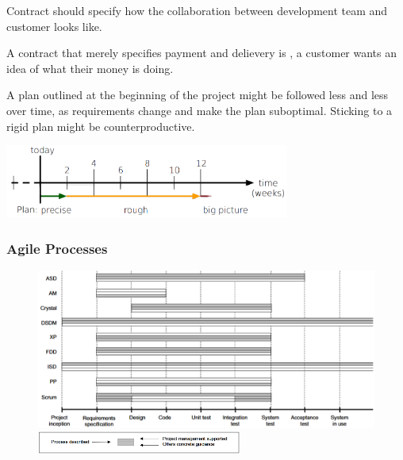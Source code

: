 \documentclass[
    ../../Software_Engineering_Summary.tex,
]
{subfiles}
\begin{document}
\begin{defbox}
    Contract should specify how the collaboration between development team and customer looks like.

    A contract that merely specifies payment and delievery is , a customer wants an idea of what their money is doing.
\end{defbox}

\begin{defbox}
    A plan outlined at the beginning of the project might be followed less and less over time, as requirements change and make the plan suboptimal. Sticking to a rigid plan might be counterproductive.

    \begin{center}
        \includegraphics[width = 0.7\textwidth]{Pics/13/Manifesto4Plan.png}
    \end{center}
\end{defbox}

\subsubsection{Agile Processes}
\begin{figure}
    [H]
    \centering
    \includegraphics[width = \textwidth]{Pics/13/AgileProcesses.png}
    \includegraphics[width = 0.6\textwidth]{Pics/13/AgileProcessesLegend.png}
\end{figure}
\end{document}
